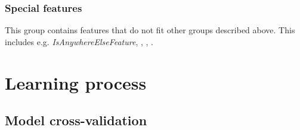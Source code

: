 \subsubsection{Special features}
This group contains features that do not fit other groups described above. This includes e.g. \textit{IsAnywhereElseFeature}, , , .

\section{Learning process}
\subsection{Model cross-validation}
